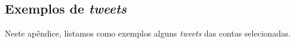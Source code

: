 \documentclass[
	12pt,				%
	oneside,			%
	a4paper,			%
	english,			%
	brazil				%
	]{abntex2ppgsi}
\begin{document}
{{%
\postextual



%
%


\begin{apendicesenv}

\chapter{Exemplos de \textit{tweets}}
\label{apendiceA}

Neste apêndice, listamos como exemplos alguns \textit{tweets} das contas selecionadas.


\end{apendicesenv}}}
\end{document}
